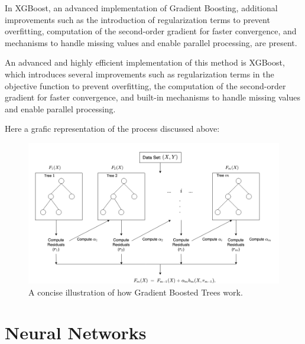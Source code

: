 In XGBoost, an advanced implementation of Gradient Boosting, additional improvements such as the introduction of regularization terms to prevent overfitting, computation of the second-order gradient for faster convergence, and mechanisms to handle missing values and enable parallel processing, are present. 


An advanced and highly efficient implementation of this method is XGBoost, which introduces several improvements such as regularization terms in the objective function to prevent overfitting, the computation of the second-order gradient for faster convergence, and built-in mechanisms to handle missing values and enable parallel processing.

Here a grafic representation of the process discussed above:


\begin{figure}[h!]
	\centering
	\includegraphics[width=0.9\linewidth]{Images/XGBoost}
	\caption{A concise illustration of how Gradient Boosted Trees work.}
	\label{fig:xgboost}
\end{figure}


\section{Neural Networks}